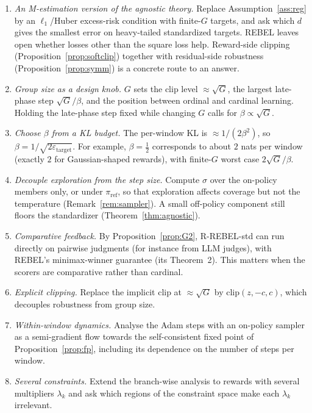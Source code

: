 \documentclass[11pt]{article}
\theoremstyle{definition}
\theoremstyle{remark}
\newcommand{\pref}{\pi_{\mathrm{ref}}}
\newcommand{\1}{\mathbb{1}}
\newcommand{\rrs}{R-REBEL-std}
\begin{document}
\begin{enumerate}[itemsep=2pt,topsep=2pt]
\item \emph{An M-estimation version of the agnostic theory.} Replace
Assumption~\ref{ass:reg} by an $\ell_1$/Huber excess-risk condition with finite-$G$
targets, and ask which $d$ gives the smallest error on heavy-tailed standardized
targets. REBEL leaves open whether losses other than the square loss help. Reward-side
clipping (Proposition~\ref{prop:softclip}) together with residual-side robustness
(Proposition~\ref{prop:symm}) is a concrete route to an answer.
\item \emph{Group size as a design knob.} $G$ sets the clip level $\approx\sqrt G$, the
largest late-phase step $\sqrt G/\beta$, and the position between ordinal and
cardinal learning. Holding the late-phase step fixed while changing $G$ calls for
$\beta\propto\sqrt G$.
\item \emph{Choose $\beta$ from a KL budget.} The per-window KL is $\approx1/(2\beta^2)$,
so $\beta=1/\sqrt{2\varepsilon_{\mathrm{target}}}$. For example, $\beta=\tfrac12$
corresponds to about $2$ nats per window (exactly $2$ for Gaussian-shaped rewards),
with finite-$G$ worst case $2\sqrt G/\beta$.
\item \emph{Decouple exploration from the step size.} Compute $\hat\sigma$ over the
on-policy members only, or under $\pref$, so that exploration affects coverage but not
the temperature (Remark~\ref{rem:sampler}). A small off-policy component still
floors the standardizer (Theorem~\ref{thm:agnostic}).
\item \emph{Comparative feedback.} By Proposition~\ref{prop:G2}, \rrs{} can run
directly on pairwise judgments (for instance from LLM judges), with REBEL's
minimax-winner guarantee (its Theorem~2). This matters when the scorers are
comparative rather than cardinal.
\item \emph{Explicit clipping.} Replace the implicit clip at $\approx\sqrt G$ by
$\mathrm{clip}(z,-c,c)$, which decouples robustness from group size.
\item \emph{Within-window dynamics.} Analyse the Adam steps with an on-policy sampler
as a semi-gradient flow towards the self-consistent fixed point of
Proposition~\ref{prop:fp}, including its dependence on the number of steps per window.
\item \emph{Several constraints.} Extend the branch-wise analysis to rewards with
several multipliers $\lambda_k$ and ask which regions of the constraint space make
each $\lambda_k$ irrelevant.
\end{enumerate}
\end{document}
